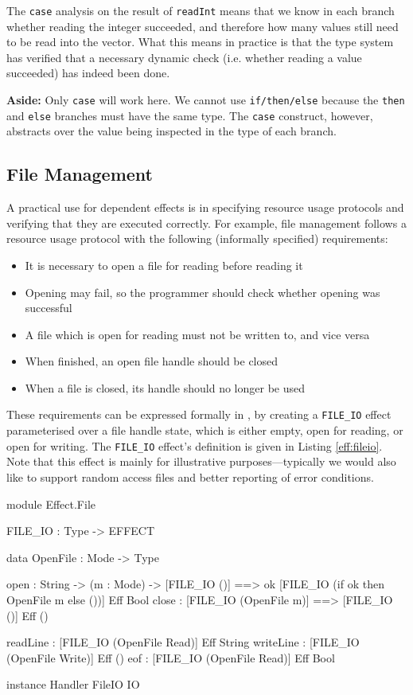 \noindent
The \texttt{case} analysis on the result of \texttt{readInt} means that
we know in each branch whether reading the integer succeeded, and therefore
how many values still need to be read into the vector. What this means in
practice is that the type system has verified that a necessary dynamic
check (i.e. whether reading a value succeeded) has indeed been done.

\textbf{Aside:} Only \texttt{case} will work here. We cannot use
\texttt{if/then/else} because the \texttt{then} and \texttt{else} branches must
have the same type. The \texttt{case} construct, however,
abstracts over the value being inspected in the type of each branch.

\subsection{File Management}

A practical use for dependent effects is in specifying resource usage protocols
and verifying that they are executed correctly. For example, file management
follows a resource usage protocol with the following (informally specified)
requirements:

\begin{itemize}
\item It is necessary to open a file for reading before reading it
\item Opening may fail, so the programmer should check whether opening 
was successful
\item A file which is open for reading must not be written to, and vice versa
\item When finished, an open file handle should be closed
\item When a file is closed, its handle should no longer be used
\end{itemize}

These requirements can be expressed formally in \effects{}, by creating
a \texttt{FILE\_IO} effect parameterised over a file handle state, which
is either empty, open for reading, or open for writing. The \texttt{FILE\_IO}
effect's definition is given in Listing \ref{eff:fileio}. Note that this
effect is mainly for illustrative purposes---typically we would also like to
support random access files and better reporting of error conditions.

\begin{code}[float=h,frame=single, caption={File I/O Effect}, label=eff:fileio]
module Effect.File

FILE_IO : Type -> EFFECT

data OpenFile : Mode -> Type

open  : String -> (m : Mode) -> 
        { [FILE_IO ()] ==> 
          {ok} [FILE_IO (if ok then OpenFile m else ())] } Eff Bool
close : { [FILE_IO (OpenFile m)] ==> [FILE_IO ()] } Eff ()

readLine  : { [FILE_IO (OpenFile Read)] } Eff String 
writeLine : { [FILE_IO (OpenFile Write)] } Eff ()
eof       : { [FILE_IO (OpenFile Read)] } Eff Bool 

instance Handler FileIO IO
\end{code}

